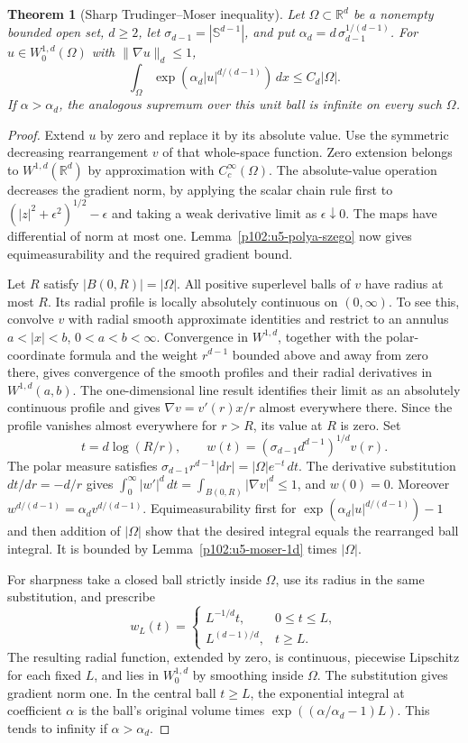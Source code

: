 \documentclass[11pt,oneside,openany]{book}
\newtheorem{theorem}{Theorem}[chapter]
\theoremstyle{definition}
\theoremstyle{remark}
\begin{document}
\begin{theorem}[Sharp Trudinger--Moser inequality]\label{p102:U5-03}
Let \(\Omega\subset\mathbb R^d\) be a nonempty bounded open set,
\(d\ge2\), let \(\sigma_{d-1}=|\mathbb S^{d-1}|\), and put
\(\alpha_d=d\,\sigma_{d-1}^{1/(d-1)}\).
For \(u\in W_0^{1,d}(\Omega)\) with \(\|\nabla u\|_d\le1\),
\[
 \int_\Omega \exp\!\left(\alpha_d |u|^{d/(d-1)}\right)\,dx
 \le C_d|\Omega|.
\]
If \(\alpha>\alpha_d\), the analogous supremum over this unit ball
is infinite on every such \(\Omega\).
\end{theorem}
\begin{proof}
Extend \(u\) by zero and replace it by its absolute value. Use the
symmetric decreasing rearrangement \(v\) of that whole-space function.
Zero extension belongs to \(W^{1,d}(\mathbb R^d)\) by approximation
with \(C_c^\infty(\Omega)\). The absolute-value operation decreases
the gradient norm, by applying the scalar chain rule first to
\((|z|^2+\epsilon^2)^{1/2}-\epsilon\) and taking a weak derivative
limit as \(\epsilon\downarrow0\). The maps have differential of norm
at most one. Lemma~\ref{p102:u5-polya-szego} now gives
equimeasurability and the required gradient bound.

Let \(R\) satisfy \(|B(0,R)|=|\Omega|\). All positive superlevel
balls of \(v\) have radius at most \(R\). Its radial profile is
locally absolutely continuous on \((0,\infty)\). To see this,
convolve \(v\) with radial smooth approximate identities and
restrict to an annulus \(a<|x|<b\), \(0<a<b<\infty\).
Convergence in \(W^{1,d}\), together with the polar-coordinate
formula and the weight \(r^{d-1}\) bounded above and away from zero
there, gives convergence of the smooth profiles and their radial
derivatives in \(W^{1,d}(a,b)\). The one-dimensional line result
identifies their limit as an absolutely continuous profile and
gives \(\nabla v=v'(r)x/r\) almost everywhere there. Since the
profile vanishes almost everywhere for \(r>R\), its value at \(R\)
is zero. Set
\[
 t=d\log(R/r),\qquad
 w(t)=(\sigma_{d-1}d^{d-1})^{1/d}v(r).
\]
The polar measure satisfies
\(\sigma_{d-1}r^{d-1}|dr|=|\Omega|e^{-t}\,dt\).
The derivative substitution \(dt/dr=-d/r\) gives
\(\int_0^\infty |w'|^d\,dt=\int_{B(0,R)}|\nabla v|^d\le1\),
and \(w(0)=0\). Moreover \(w^{d/(d-1)}=\alpha_d v^{d/(d-1)}\).
Equimeasurability first for \(\exp(\alpha_d |u|^{d/(d-1)})-1\)
and then addition of \(|\Omega|\) show that the desired integral
equals the rearranged ball integral. It is bounded by
Lemma~\ref{p102:u5-moser-1d} times \(|\Omega|\).

For sharpness take a closed ball strictly inside \(\Omega\), use its
radius in the same substitution, and prescribe
\[
 w_L(t)=
 \begin{cases}
 L^{-1/d}t,&0\le t\le L,\\
 L^{(d-1)/d},&t\ge L.
 \end{cases}
\]
The resulting radial function, extended by zero, is continuous,
piecewise Lipschitz for each fixed \(L\), and lies in \(W_0^{1,d}\)
by smoothing inside \(\Omega\). The substitution gives gradient norm
one. In the central ball \(t\ge L\), the exponential integral at
coefficient \(\alpha\) is the ball's original volume times
\(\exp((\alpha/\alpha_d-1)L)\). This tends to infinity if
\(\alpha>\alpha_d\).
\end{proof}
\end{document}
